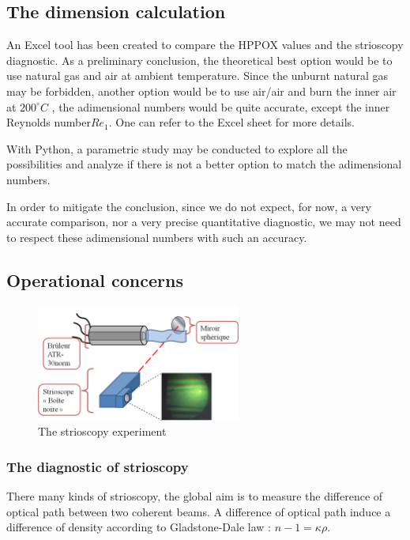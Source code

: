 \subsection{The dimension calculation }
An Excel tool has been created to compare the HPPOX values and the strioscopy diagnostic. As a preliminary conclusion, the theoretical best option would be to use natural gas and air at ambient temperature. Since the unburnt natural gas may be forbidden, another option would be to use air/air and burn the inner air at $200 ^\circ C$ , the adimensional numbers would be quite accurate, except the inner Reynolds number$Re_{1}$. One can refer to the Excel sheet for more details. 

With Python, a parametric study may be conducted to explore all the possibilities and analyze if there is not a better option to match the adimensional numbers.

In order to mitigate the conclusion, since we do not expect, for now, a very accurate comparison, nor a very precise quantitative diagnostic, we may not need to respect these adimensional numbers with such an accuracy. 

\subsection{Operational concerns}

\begin{figure}[!h]
  \centering
\includegraphics[width=0.6\textwidth]{fig/Schema_strio.png}
  \caption{The strioscopy experiment}
 \label{schema_strio}
\end{figure}
\subsubsection{The diagnostic of strioscopy }

There many kinds of strioscopy, the global aim is to measure the difference of optical path between two coherent beams. A difference of optical path induce a difference of density according to Gladstone-Dale law : $n-1=\kappa  \rho$. 

